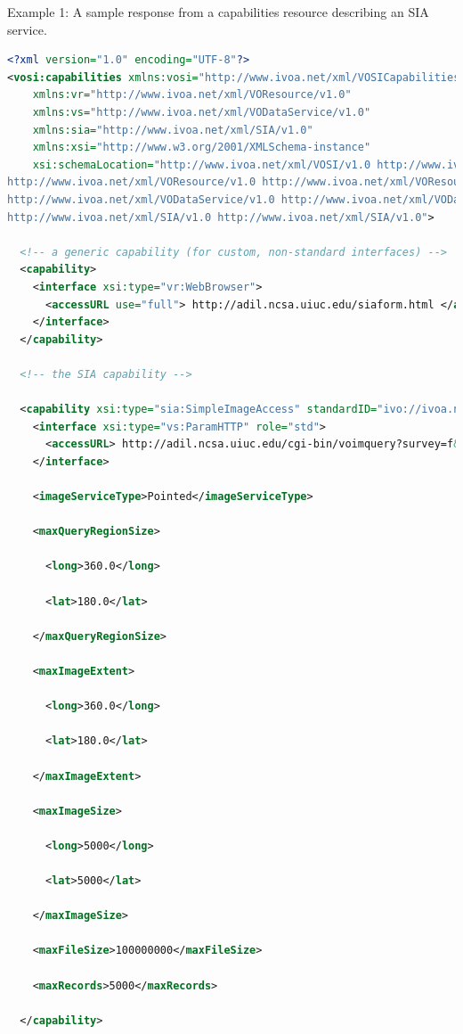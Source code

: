 \documentclass[11pt,letter]{ivoa}
\begin{document}
Example 1:
A sample response from a capabilities resource describing an SIA service. 

\begin{lstlisting}[language=XML]
<?xml version="1.0" encoding="UTF-8"?>
<vosi:capabilities xmlns:vosi="http://www.ivoa.net/xml/VOSICapabilities/v1.0"
    xmlns:vr="http://www.ivoa.net/xml/VOResource/v1.0"
    xmlns:vs="http://www.ivoa.net/xml/VODataService/v1.0"
    xmlns:sia="http://www.ivoa.net/xml/SIA/v1.0"
    xmlns:xsi="http://www.w3.org/2001/XMLSchema-instance"
    xsi:schemaLocation="http://www.ivoa.net/xml/VOSI/v1.0 http://www.ivoa.net/xml/VOSI/v1.0
http://www.ivoa.net/xml/VOResource/v1.0 http://www.ivoa.net/xml/VOResource/v1.0
http://www.ivoa.net/xml/VODataService/v1.0 http://www.ivoa.net/xml/VODataService/v1.0
http://www.ivoa.net/xml/SIA/v1.0 http://www.ivoa.net/xml/SIA/v1.0">

  <!-- a generic capability (for custom, non-standard interfaces) -->
  <capability>
    <interface xsi:type="vr:WebBrowser">
      <accessURL use="full"> http://adil.ncsa.uiuc.edu/siaform.html </accessURL>
    </interface>
  </capability>
  
  <!-- the SIA capability -->
 
  <capability xsi:type="sia:SimpleImageAccess" standardID="ivo://ivoa.net/std/SIA">
    <interface xsi:type="vs:ParamHTTP" role="std">
      <accessURL> http://adil.ncsa.uiuc.edu/cgi-bin/voimquery?survey=f&amp; </accessURL>
    </interface>

    <imageServiceType>Pointed</imageServiceType>

    <maxQueryRegionSize>

      <long>360.0</long>

      <lat>180.0</lat>

    </maxQueryRegionSize>

    <maxImageExtent>

      <long>360.0</long>

      <lat>180.0</lat>

    </maxImageExtent>

    <maxImageSize>

      <long>5000</long>

      <lat>5000</lat>

    </maxImageSize>

    <maxFileSize>100000000</maxFileSize>

    <maxRecords>5000</maxRecords>

  </capability>


\end{lstlisting}
\end{document}
